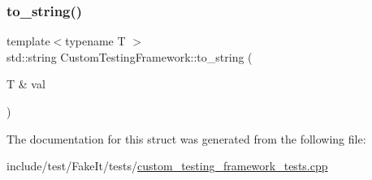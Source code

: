 \subsubsection{\texorpdfstring{to\_string()}{to\_string()}}
{\footnotesize\ttfamily template$<$typename T $>$ \\
std\+::string Custom\+Testing\+Framework\+::to\+\_\+string (\begin{DoxyParamCaption}\item[{T \&}]{val }\end{DoxyParamCaption})\hspace{0.3cm}{\ttfamily [inline]}}



The documentation for this struct was generated from the following file\+:\begin{DoxyCompactItemize}
\item 
include/test/\+Fake\+It/tests/\mbox{\hyperlink{custom__testing__framework__tests_8cpp}{custom\+\_\+testing\+\_\+framework\+\_\+tests.\+cpp}}\end{DoxyCompactItemize}
